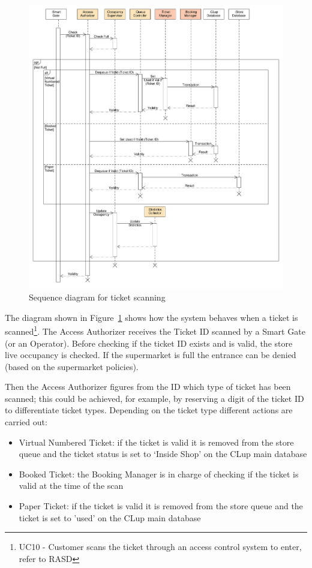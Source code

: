 \begin{figure}[H]
    \hspace*{-1.8cm}
    \includegraphics[width=1.2\textwidth]{Images/UML_ticket_scan_sequence.pdf}
    \caption{\label{fig:UML_ticket_scan_sequence}Sequence diagram for ticket scanning}
\end{figure}
The diagram shown in Figure~\ref{fig:UML_ticket_scan_sequence} shows how the system behaves when a ticket is scanned\footnote{UC10 - Customer scans the ticket through an access control system to enter, refer to RASD}. The Access Authorizer receives the Ticket ID scanned by a Smart Gate (or an Operator). Before checking if the ticket ID exists and is valid, the store live occupancy is checked. If the supermarket is full the entrance can be denied (based on the supermarket policies).

Then the Access Authorizer figures from the ID which type of ticket has been scanned; this could be achieved, for example, by reserving a digit of the ticket ID to differentiate ticket types.
Depending on the ticket type different actions are carried out:
\begin{itemize}
    \item Virtual Numbered Ticket: if the ticket is valid it is removed from the store queue and the ticket status is set to `Inside Shop' on the CLup main database
    \item Booked Ticket: the Booking Manager is in charge of checking if the ticket is valid at the time of the scan
    \item Paper Ticket: if the ticket is valid it is removed from the store queue and the ticket is set to 'used' on the CLup main database
\end{itemize}

